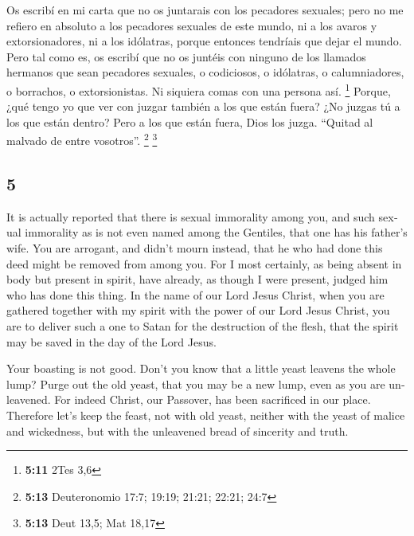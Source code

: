 \begin{paracol}{2}
 Os escribí en mi carta que no os juntarais con los
pecadores sexuales;  pero no me refiero en absoluto a los
pecadores sexuales de este mundo, ni a los avaros y extorsionadores, ni
a los idólatras, porque entonces tendríais que dejar el mundo.
 Pero tal como es, os escribí que no os juntéis con
ninguno de los llamados hermanos que sean pecadores sexuales, o
codiciosos, o idólatras, o calumniadores, o borrachos, o extorsionistas.
Ni siquiera comas con una persona así. \footnote{\textbf{5:11} 2Tes 3,6}
 Porque, ¿qué tengo yo que ver con juzgar también a los
que están fuera? ¿No juzgas tú a los que están dentro? 
Pero a los que están fuera, Dios los juzga. ``Quitad al malvado de entre
vosotros''. \footnote{\textbf{5:13} Deuteronomio 17:7; 19:19; 21:21;
  22:21; 24:7} \footnote{\textbf{5:13} Deut 13,5; Mat 18,17}

\switchcolumn
\begin{otherlanguage}{english}

\hypertarget{section-9}{%
\section{5}\label{section-9}}

 It is actually reported that there is sexual immorality
among you, and such sexual immorality as is not even named among the
Gentiles, that one has his father's wife.  You are
arrogant, and didn't mourn instead, that he who had done this deed might
be removed from among you.  For I most certainly, as being
absent in body but present in spirit, have already, as though I were
present, judged him who has done this thing.  In the name
of our Lord Jesus Christ, when you are gathered together with my spirit
with the power of our Lord Jesus Christ,  you are to
deliver such a one to Satan for the destruction of the flesh, that the
spirit may be saved in the day of the Lord Jesus.

 Your boasting is not good. Don't you know that a little
yeast leavens the whole lump?  Purge out the old yeast,
that you may be a new lump, even as you are unleavened. For indeed
Christ, our Passover, has been sacrificed in our place. 
Therefore let's keep the feast, not with old yeast, neither with the
yeast of malice and wickedness, but with the unleavened bread of
sincerity and truth.


\end{otherlanguage}
\end{paracol}
